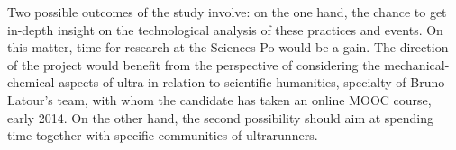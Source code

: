 Two possible outcomes of the study involve: on the one hand, the chance to get in-depth insight on the technological analysis of these practices and events. On this matter, time for research at the Sciences Po would be a gain. 
The direction of the project would benefit from the perspective of considering the mechanical-chemical aspects of ultra in relation to scientific humanities, specialty of Bruno Latour’s team, with whom the candidate has taken an online MOOC course, early 2014. On the other hand, the second possibility should aim at spending time together with specific communities of ultrarunners.

